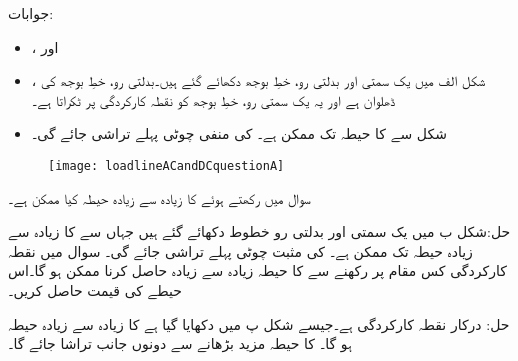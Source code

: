 جوابات:
\begin{itemize}
\item
{}،  اور 
\item
{}، شکل  الف میں یک سمتی اور بدلتی رو، خطِ بوجھ  دکھائے گئے ہیں۔بدلتی رو، خطِ بوجھ  کی ڈھلوان  ہے اور یہ یک سمتی رو، خطِ بوجھ  کو نقطہ کارکردگی پر ٹکراتا ہے۔
\item
شکل سے   کا حیطہ  تک ممکن ہے۔ کی منفی چوٹی پہلے تراشی جائے گی۔
\end{itemize}
%
\begin{figure}
\centering
\texttt{[image: loadlineACandDCquestionA]}
\caption{}
\label{شکل_سوال_ٹرانزسٹر_یکسمتی_بدلتی_بار_خط_الف}
\end{figure}

سوال  میں  رکھتے ہوئے  کا زیادہ سے زیادہ حیطہ کیا ممکن ہے۔

حل:شکل  ب میں یک سمتی اور بدلتی رو خطوط دکھائے گئے ہیں جہاں سے  کا زیادہ سے زیادہ حیطہ  تک ممکن ہے۔ کی مثبت چوٹی پہلے تراشی جائے گی۔
سوال  میں نقطہ کارکردگی کس مقام پر رکھنے سے  کا حیطہ زیادہ سے زیادہ حاصل کرنا ممکن ہو گا۔اس حیطے کی قیمت حاصل کریں۔

حل: درکار نقطہ کارکردگی ہے۔جیسے شکل  پ میں دکھایا گیا ہے  کا زیادہ سے زیادہ حیطہ  ہو گا۔ کا حیطہ مزید بڑھانے سے دونوں جانب تراشا جائے گا۔


